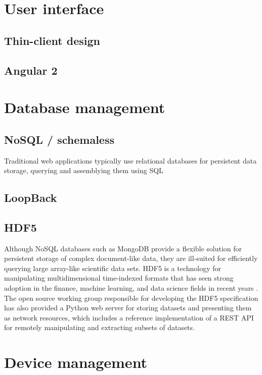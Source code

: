\documentclass[../thesis]{subfiles}
\begin{document}
\section{User interface}

\subsection{Thin-client design}

\subsection{Angular 2}


\section{Database management}

\subsection{NoSQL / schemaless}
Traditional web applications typically use relational databases for
persistent data storage, querying and assemblying them using \gls{SQL}

\subsection{LoopBack}

\subsection{HDF5}
Although NoSQL databases such as MongoDB provide a flexible solution
for persistent storage of complex document-like data, they are
ill-suited for efficiently querying large array-like scientific data
sets.   HDF5 is a technology for manipulating multidimensional
time-indexed formats that has seen strong adoption in the finance, machine
learning, and data science fields in recent years \cite{HDF5}. The
open source working group responsible for developing the HDF5
specification has also provided a Python web server for storing
datasets and presenting them as network resources, which includes a
reference implementation of a REST API for remotely manipulating
and extracting subsets of datasets.


\section{Device management}
\end{document}
